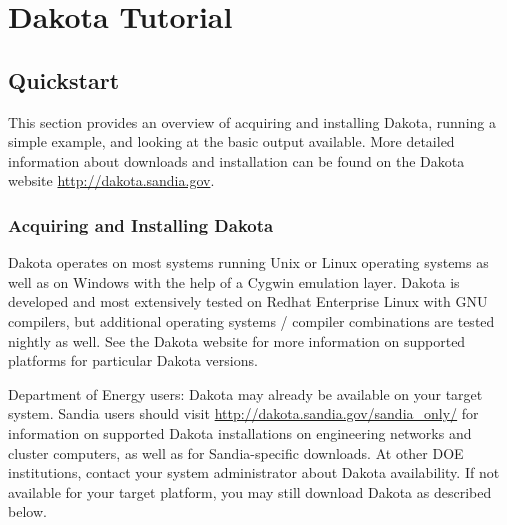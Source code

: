 
\chapter{Dakota Tutorial}\label{tutorial}

\section {Quickstart}\label{tutorial:installation:quickstart}
This section provides an overview of acquiring and installing Dakota, 
running a simple example, and looking at the basic output available. 
More detailed information about downloads and installation can be found 
on the Dakota website \url{http://dakota.sandia.gov}.

\subsection {Acquiring and Installing Dakota}\label{tutorial:quickstart:installation}

Dakota operates on most systems running Unix or Linux operating
systems as well as on Windows with the help of a Cygwin emulation
layer. Dakota is developed and most extensively tested on Redhat
Enterprise Linux with GNU compilers, but additional operating systems
/ compiler combinations are tested nightly as well. See the Dakota
website for more information on supported platforms for particular
Dakota versions.

Department of Energy users: Dakota may already be available on your
target system. Sandia users should visit
\url{http://dakota.sandia.gov/sandia_only/} for information on
supported Dakota installations on engineering networks and cluster
computers, as well as for Sandia-specific downloads. At other DOE
institutions, contact your system administrator about Dakota
availability. If not available for your target platform, you may
still download Dakota as described below. 

